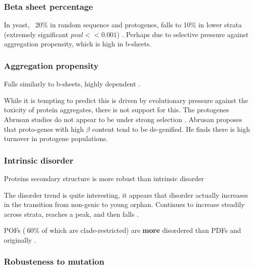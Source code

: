     \FloatBarrier

  \subsubsection{Beta sheet percentage}

    In yeast, ~20\% in random sequence and protogenes, falls to 10\% in
    lower strata (extremely significant $pval << 0.001$)
    \cite{abrusan_integration_2013}. Perhaps due to selective pressure
    against aggregation propensity, which is high in b-sheets.

  \subsubsection{Aggregation propensity}

    Falls similarly to b-sheets, highly dependent
    \cite{abrusan_integration_2013}.

    While it is tempting to predict this is driven by evolutionary
    pressure against the toxicity of protein aggregates, there is not
    support for this. The protogenes Abrusan studies do not appear to
    be under strong selection \cite{carvunis_proto-genes_2012}. Abrusan
    proposes that proto-genes with high $\beta$ content tend to be
    de-genified. He finds there is high turnover in protogene
    populations.

  \subsubsection{Intrinsic disorder}

    Proteins secondary structure is more robust than intrinsic disorder
    \cite{schaefer_protein_2010}

    The disorder trend is quite interesting, it appears that disorder
    actually increases in the transition from non-genic to young
    orphan. Continues to increase steadily across strata, reaches a
    peak, and then falls \cite{carvunis_proto-genes_2012}.

    POFs ($~$60\% of which are clade-restricted) are \textbf{more}
    disordered than PDFs \cite[review]{gollery_pofs:_2007} and
    originally \cite{gollery_what_2006}.

  \subsubsection{Robusteness to mutation}

